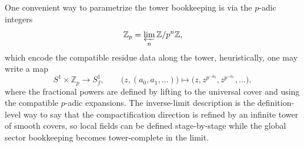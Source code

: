 \documentclass[11pt]{article}
\theoremstyle{remark}
\newcommand{\Z}{\mathbb{Z}}
\begin{document}
One convenient way to parametrize the tower bookkeeping is via the \(p\)-adic integers
\begin{equation}\label{23}
\Z_p=\varprojlim_n \Z/p^n\Z,
\end{equation}
which encode the compatible residue data along the tower, heuristically, one may write a map
\begin{equation}\label{22}
S^1\times \Z_p\to S_f^1,\qquad \bigl(z,(a_0,a_1,\ldots)\bigr)\mapsto \bigl(z, z^{p^{-a_0}}, z^{p^{-a_1}},\ldots\bigr),
\end{equation}
where the fractional powers are defined by lifting to the universal cover and using the compatible \(p\)-adic expansions. The inverse-limit description is the definition-level way to say that the compactification direction is refined by an infinite tower of smooth covers, so local fields can be defined stage-by-stage while the global sector bookkeeping becomes tower-complete in the limit.
\end{document}

